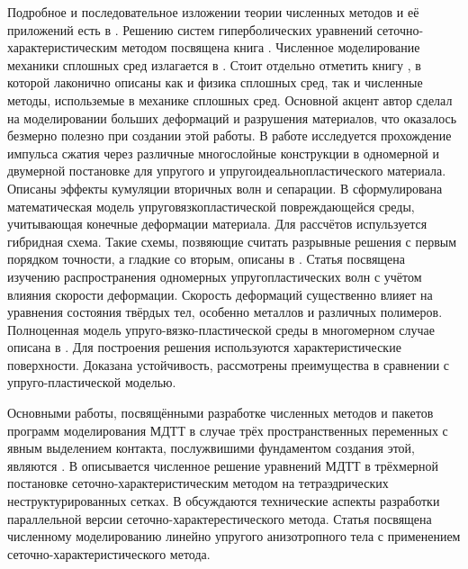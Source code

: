 	Подробное и последовательное изложении теории численных методов и её приложений есть в \cite{petrov_book}.
	Решению систем гиперболических уравнений сеточно-характеристическим методом посвящена книга \cite{magomedov}.
	Численное моделирование механики сплошных сред излагается в \cite{belocerkovsky,kukudzhanov_main}.
	Стоит отдельно отметить книгу \cite{kukudzhanov_main}, в которой лаконично описаны как и физика сплошных сред, так и численные методы, использемые в механике сплошных сред.
	Основной акцент автор сделал на моделировании больших деформаций и разрушения материалов, что оказалось безмерно полезно при создании этой работы.
	В работе \cite{petrov_tormasov_holodov} исследуется прохождение импульса сжатия через различные многослойные конструкции в одномерной и двумерной постановке для упругого и упругоидеальнопластического материала. Описаны эффекты кумуляции вторичных волн и сепарации.
	В \cite{ivanov_kondaurov_petrov_holodov} сформулирована математическая модель упруговязкопластической повреждающейся среды, учитывающая конечные деформации материала. 
	Для рассчётов испульзуется гибридная схема.
	Такие схемы, позвяющие считать разрывные решения с первым порядком точности, а гладкие со вторым, описаны в \cite{fedorenko}.
	Статья \cite{kukudzhanov1} посвящена изучению распространения одномерных упругопластических волн с учётом влияния скорости деформации. 
	Скорость деформаций существенно влияет на уравнения состояния твёрдых тел, особенно металлов и различных полимеров.
	Полноценная модель упруго-вязко-пластической среды в многомерном случае описана в \cite{kukudzhanov2}. 
	Для построения решения используются характеристические поверхности. Доказана устойчивость, рассмотрены преимущества в сравнении с упруго-пластической моделью.
	
	
	Основными работы, посвящёнными разработке численных методов и пакетов программ моделирования МДТТ в случае трёх пространственных переменных с явным выделением контакта, послужвишими фундаментом создания этой, являются \cite{a4,a6}.
	В \cite{a6} описывается численное решение уравнений МДТТ в трёхмерной постановке сеточно-характеристическим методом на тетраэдрических неструктурированных сетках.
	В \cite{a4} обсуждаются технические аспекты разработки параллельной версии сеточно-характерестического метода. 
	Статья \cite{favorskaya} посвящена численному моделированию линейно упругого анизотропного тела с применением сеточно-характеристического метода.
	
